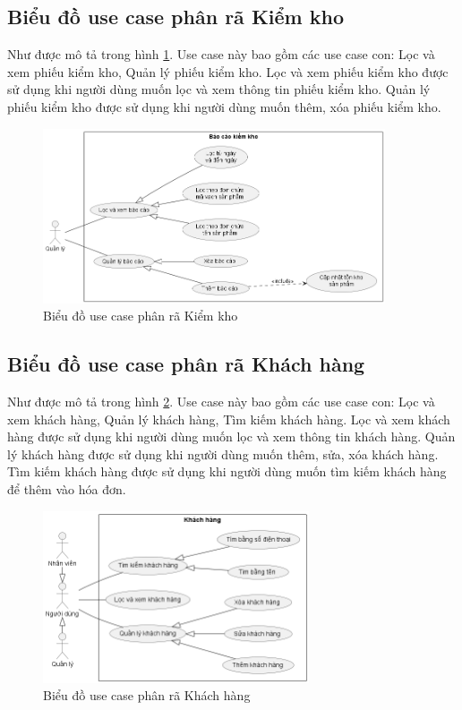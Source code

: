 \documentclass[../DoAn.tex]{subfiles}
\begin{document}
\subsection{Biểu đồ use case phân rã Kiểm kho}
\label{subsection:uc-auditreport}
Như được mô tả trong hình \ref{fig:uc-auditreport}. Use case này bao gồm các use case con: Lọc và xem phiếu kiểm kho, Quản lý phiếu kiểm kho. Lọc và xem phiếu kiểm kho được sử dụng khi người dùng muốn lọc và xem thông tin phiếu kiểm kho. Quản lý phiếu kiểm kho được sử dụng khi người dùng muốn thêm, xóa phiếu kiểm kho.

\begin{figure}[H]
    \centering
    \includegraphics[width=0.9\textwidth]{Hinhve/usecases/AuditReport}
    \caption{Biểu đồ use case phân rã Kiểm kho}
    \label{fig:uc-auditreport}
\end{figure}


\subsection{Biểu đồ use case phân rã Khách hàng}
\label{subsection:uc-client}
Như được mô tả trong hình \ref{fig:uc-client}. Use case này bao gồm các use case con: Lọc và xem khách hàng, Quản lý khách hàng, Tìm kiếm khách hàng. Lọc và xem khách hàng được sử dụng khi người dùng muốn lọc và xem thông tin khách hàng. Quản lý khách hàng được sử dụng khi người dùng muốn thêm, sửa, xóa khách hàng. Tìm kiếm khách hàng được sử dụng khi người dùng muốn tìm kiếm khách hàng để thêm vào hóa đơn.

\begin{figure}[H]
    \centering
    \includegraphics[width=0.7\textwidth]{Hinhve/usecases/Client}
    \caption{Biểu đồ use case phân rã Khách hàng}
    \label{fig:uc-client}
\end{figure}
\end{document}
